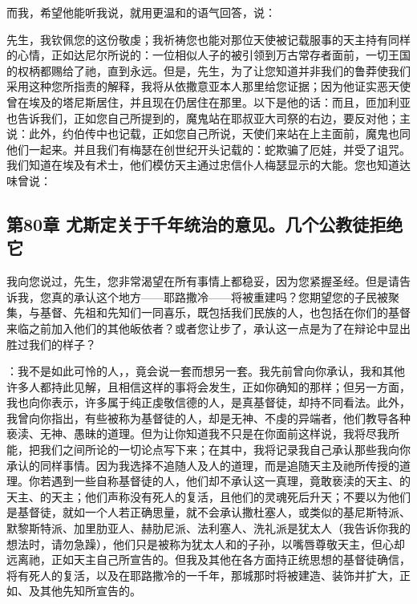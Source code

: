 而我，希望他能听我说，就用更温和的语气回答，说：\par

先生，我钦佩您的这份敬虔；我祈祷您也能对那位天使被记载服事的天主持有同样的心情，正如达尼尔所说的：一位相似人子的被引领到万古常存者面前，一切王国的权柄都赐给了祂，直到永远。但是，先生，为了让您知道并非我们的鲁莽使我们采用这种您所指责的解释，我将从依撒意亚本人那里给您证据；因为他证实恶天使曾在埃及的塔尼斯居住，并且现在仍居住在那里。以下是他的话：而且，匝加利亚也告诉我们，正如您自己所提到的，魔鬼站在耶叔亚大司祭的右边，要反对他；主说：此外，约伯传中也记载，正如您自己所说，天使们来站在上主面前，魔鬼也同他们一起来。并且我们有梅瑟在创世纪开头记载的：蛇欺骗了厄娃，并受了诅咒。我们知道在埃及有术士，他们模仿天主通过忠信仆人梅瑟显示的大能。您也知道达味曾说：\par


\subsection{第80章 尤斯定关于千年统治的意见。几个公教徒拒绝它}

我向您说过，先生，您非常渴望在所有事情上都稳妥，因为您紧握圣经。但是请告诉我，您真的承认这个地方——耶路撒冷——将被重建吗？您期望您的子民被聚集，与基督、先祖和先知们一同喜乐，既包括我们民族的人，也包括在你们的基督来临之前加入他们的其他皈依者？或者您让步了，承认这一点是为了在辩论中显出胜过我们的样子？\par

：我不是如此可怜的人，，竟会说一套而想另一套。我先前曾向你承认，我和其他许多人都持此见解，且相信这样的事将会发生，正如你确知的那样；但另一方面，我也向你表示，许多属于纯正虔敬信德的人，是真基督徒，却持不同看法。此外，我曾向你指出，有些被称为基督徒的人，却是无神、不虔的异端者，他们教导各种亵渎、无神、愚昧的道理。但为让你知道我不只是在你面前这样说，我将尽我所能，把我们之间所论的一切论点写下来；在其中，我将记录我自己承认那些我向你承认的同样事情。因为我选择不追随人及人的道理，而是追随天主及祂所传授的道理。你若遇到一些自称基督徒的人，他们却不承认这一真理，竟敢亵渎的天主、的天主、的天主；他们声称没有死人的复活，且他们的灵魂死后升天；不要以为他们是基督徒，就如一个人若正确思量，就不会承认撒杜塞人，或类似的基尼斯特派、默黎斯特派、加里肋亚人、赫肋尼派、法利塞人、洗礼派是犹太人（我告诉你我的想法时，请勿急躁），他们只是被称为犹太人和的子孙，以嘴唇尊敬天主，但心却远离祂，正如天主自己所宣告的。但我及其他在各方面持正统思想的基督徒确信，将有死人的复活，以及在耶路撒冷的一千年，那城那时将被建造、装饰并扩大，正如、及其他先知所宣告的。\par


